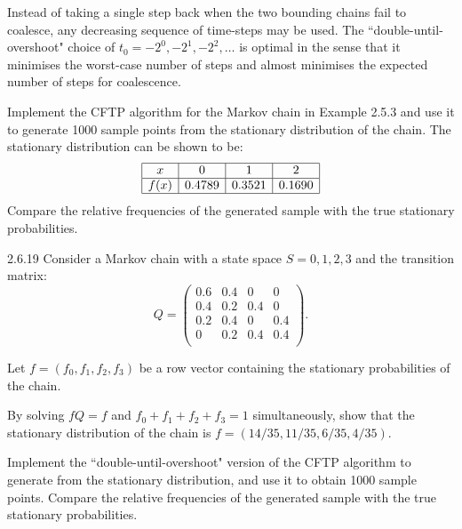 Instead of taking a single step back when the two bounding chains fail to coalesce, any decreasing sequence of time-steps may be used. The \textquotedblleft double-until-overshoot" choice of $t_0=-2^0,-2^1,-2^2,\ldots$ is optimal in the sense that it minimises the worst-case number of steps and almost minimises the expected number of steps for coalescence.


\begin{exercise}
Implement the CFTP algorithm for the Markov chain in Example 2.5.3 and use it to generate 1000 sample points from the stationary distribution of the chain. The stationary distribution can be shown to be:
$$\begin{array}{|c|c|c|c|}\hline
x	&0&	1&	2\\ \hline
f(x)	&0.4789	&0.3521	&0.1690\\ \hline
\end{array}$$
Compare the relative frequencies of the generated sample with the true stationary probabilities.

\end{exercise}

\begin{exercise}
2.6.19	Consider a Markov chain with a state space $S = {0, 1, 2, 3}$ and the transition matrix:
$$Q=\left( \begin{array}{cccc}
0.6&0.4&0&0\\
0.4&0.2&0.4&0\\
0.2&0.4&0&0.4\\
0&0.2&0.4&0.4\\
\end{array}\right).$$

Let $f=(f_0,f_1,f_2,f_3)$ be a row vector containing the stationary probabilities of the chain.
\begin{asparaenum}[(a)]
\item By solving $fQ=f$ and $f_0+f_1+f_2+f_3=1$ simultaneously, show that the stationary distribution of the chain is $f=(14/35,11/35,6/35,4/35)$.

\item Implement the \textquotedblleft double-until-overshoot" version of the CFTP algorithm to generate from the stationary distribution, and use it to obtain 1000 sample points. Compare the relative frequencies of the generated sample with the true stationary probabilities.
\end{asparaenum}
\end{exercise}

~
